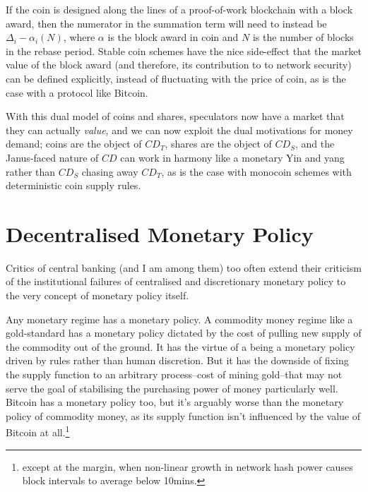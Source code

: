 \documentclass[twocolumn]{article}
\begin{document}
If the coin is designed along the lines of a proof-of-work blockchain
with a block award, then the numerator in the summation term will
need to instead be $\Delta_{i} - \alpha_{i}(N)$, where $\alpha$ is the
block award in coin and $N$ is the number of blocks in the rebase
period. Stable coin schemes have the nice side-effect that the market
value of the block award (and therefore, its contribution to to
network security) can be defined explicitly, instead of fluctuating
with the price of coin, as is the case with a protocol like Bitcoin.

With this dual model of coins and shares, speculators now have a
market that they can actually \emph{value}, and we can now exploit the
dual motivations for money demand; coins are the object of $CD_{T}$,
shares are the object of $CD_{S}$, and the Janus-faced nature of $CD$
can work in harmony like a monetary Yin and yang rather than $CD_{S}$
chasing away $CD_{T}$, as is the case with monocoin schemes with
deterministic coin supply rules.

\section*{Decentralised Monetary Policy}
Critics of central banking (and I am among them) too often extend
their criticism of the institutional failures of centralised and
discretionary monetary policy to the very concept of monetary policy
itself. 

Any monetary regime has a monetary policy. A commodity money regime
like a gold-standard has a monetary policy dictated by the cost of
pulling new supply of the commodity out of the ground. It has the
virtue of a being a monetary policy driven by rules rather than human
discretion. But it has the downside of fixing the supply function to
an arbitrary process--cost of mining gold--that may not serve the goal
of stabilising the purchasing power of money particularly
well. Bitcoin has a monetary policy too, but it's arguably worse than
the monetary policy of commodity money, as its supply function isn't
influenced by the value of Bitcoin at all.\footnote{except at the
  margin, when non-linear growth in network hash power causes block
  intervals to average below 10mins.}
\end{document}
